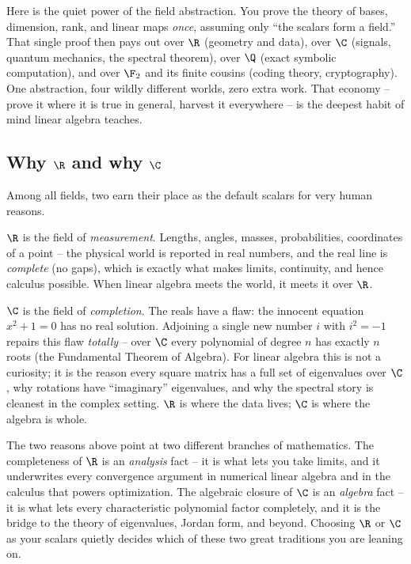 \begin{aestheticbox}
Here is the quiet power of the field abstraction. You prove the theory of bases,
dimension, rank, and linear maps \emph{once}, assuming only ``the scalars form a field.''
That single proof then pays out over $\R$ (geometry and data), over $\C$ (signals,
quantum mechanics, the spectral theorem), over $\Q$ (exact symbolic computation), and over
$\F_2$ and its finite cousins (coding theory, cryptography). One abstraction, four wildly
different worlds, zero extra work. That economy -- prove it where it is true in general,
harvest it everywhere -- is the deepest habit of mind linear algebra teaches.
\end{aestheticbox}

\subsection{Why $\R$ and why $\C$}

Among all fields, two earn their place as the default scalars for very human reasons.

$\R$ is the field of \emph{measurement}. Lengths, angles, masses, probabilities,
coordinates of a point -- the physical world is reported in real numbers, and the real
line is \emph{complete} (no gaps), which is exactly what makes limits, continuity, and
hence calculus possible. When linear algebra meets the world, it meets it over $\R$.

$\C$ is the field of \emph{completion}. The reals have a flaw: the innocent equation
$x^2 + 1 = 0$ has no real solution. Adjoining a single new number $i$ with $i^2 = -1$
repairs this flaw \emph{totally} -- over $\C$ every polynomial of degree $n$ has exactly
$n$ roots (the Fundamental Theorem of Algebra). For linear algebra this is not a
curiosity; it is the reason every square matrix has a full set of eigenvalues over $\C$,
why rotations have ``imaginary'' eigenvalues, and why the spectral story is cleanest in
the complex setting. $\R$ is where the data lives; $\C$ is where the algebra is whole.

\begin{connectionbox}
The two reasons above point at two different branches of mathematics. The completeness of
$\R$ is an \emph{analysis} fact -- it is what lets you take limits, and it underwrites
every convergence argument in numerical linear algebra and in the calculus that powers
optimization. The algebraic closure of $\C$ is an \emph{algebra} fact -- it is what lets
every characteristic polynomial factor completely, and it is the bridge to the theory of
eigenvalues, Jordan form, and beyond. Choosing $\R$ or $\C$ as your scalars quietly
decides which of these two great traditions you are leaning on.
\end{connectionbox}

